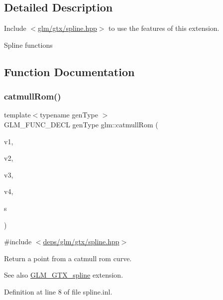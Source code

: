\subsection{Detailed Description}
Include $<$\hyperlink{spline_8hpp}{glm/gtx/spline.\+hpp}$>$ to use the features of this extension.

Spline functions 

\subsection{Function Documentation}
\mbox{\label{group__gtx__spline_ga8119c04f8210fd0d292757565cd6918d}} 
\subsubsection{\texorpdfstring{catmull\+Rom()}{catmullRom()}}
{\footnotesize\ttfamily template$<$typename gen\+Type $>$ \\
G\+L\+M\+\_\+\+F\+U\+N\+C\+\_\+\+D\+E\+CL gen\+Type glm\+::catmull\+Rom (\begin{DoxyParamCaption}\item[{gen\+Type const \&}]{v1,  }\item[{gen\+Type const \&}]{v2,  }\item[{gen\+Type const \&}]{v3,  }\item[{gen\+Type const \&}]{v4,  }\item[{typename gen\+Type\+::value\+\_\+type const \&}]{s }\end{DoxyParamCaption})}



{\ttfamily \#include $<$\hyperlink{spline_8hpp}{deps/glm/gtx/spline.\+hpp}$>$}

Return a point from a catmull rom curve. \begin{DoxySeeAlso}{See also}
\hyperlink{group__gtx__spline}{G\+L\+M\+\_\+\+G\+T\+X\+\_\+spline} extension. 
\end{DoxySeeAlso}


Definition at line 8 of file spline.\+inl.

